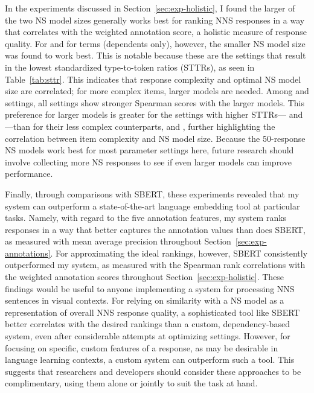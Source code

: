 In the experiments discussed in Section~\ref{sec:exp-holistic}, I found the larger of the two NS model sizes generally works best for ranking NNS responses in a way that correlates with the weighted annotation score, a holistic measure of response quality. For  and for  terms (dependents only), however, the smaller NS model size was found to work best. This is notable because these are the settings that result in the lowest standardized type-to-token ratios (STTRs), as seen in Table~\ref{tab:sttr}. This indicates that response complexity and optimal NS model size are correlated; for more complex items, larger models are needed. Among  and  settings, all settings show stronger Spearman scores with the larger models. This preference for larger models is greater for the settings with higher STTRs--- and ---than for their less complex counterparts,  and , further highlighting the correlation between item complexity and NS model size. Because the 50-response NS models work best for most parameter settings here, future research should involve collecting more NS responses to see if even larger models can improve performance.

Finally, through comparisons with SBERT, these experiments revealed that my system can outperform a state-of-the-art language embedding tool at particular tasks. Namely, with regard to the five annotation features, my system ranks responses in a way that better captures the annotation values than does SBERT, as measured with mean average precision throughout Section~\ref{sec:exp-annotations}. For approximating the ideal rankings, however, SBERT consistently outperformed my system, as measured with the Spearman rank correlations with the weighted annotation scores throughout Section~\ref{sec:exp-holistic}. These findings would be useful to anyone implementing a system for processing NNS sentences in visual contexts. For relying on similarity with a NS model as a representation of overall NNS response quality, a sophisticated tool like SBERT better correlates with the desired rankings than a custom, dependency-based system, even after considerable attempts at optimizing settings. However, for focusing on specific, custom features of a response, as may be desirable in language learning contexts, a custom system can outperform such a tool. This suggests that researchers and developers should consider these approaches to be complimentary, using them alone or jointly to suit the task at hand.


